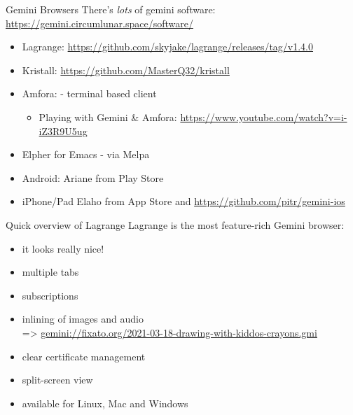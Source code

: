 \documentclass[presentation, 11pt,  aspectratio=169]{beamer}
\begin{document}
\begin{frame}[label={sec:orgd544e78}]{Gemini Browsers}
There's \emph{lots} of gemini software: \url{https://gemini.circumlunar.space/software/}\\

\begin{itemize}
\item \alert{Lagrange:} \url{https://github.com/skyjake/lagrange/releases/tag/v1.4.0}\\
\item \alert{Kristall:} \url{https://github.com/MasterQ32/kristall}\\
\item \alert{Amfora:} - terminal based client\\
\begin{itemize}
\item Playing with Gemini \& Amfora: \url{https://www.youtube.com/watch?v=i-iZ3R9U5ug}\\
\end{itemize}
\item \alert{Elpher} for Emacs - via Melpa\\
\item \alert{Android:} Ariane from Play Store\\
\item \alert{iPhone/Pad} Elaho from App Store and \url{https://github.com/pitr/gemini-ios}\\
\end{itemize}
\end{frame}

\begin{frame}[label={sec:org2448b1b}]{Quick overview of Lagrange}
Lagrange is the most feature-rich Gemini browser:\\
\begin{itemize}
\item it looks really nice!\\
\item multiple tabs\\
\item subscriptions\\
\item inlining of images and audio\\
=> \href{gemini://fixato.org/2021-03-18-drawing-with-kiddos-crayons.gmi}{gemini://fixato.org/2021-03-18-drawing-with-kiddos-crayons.gmi}\\
\item clear certificate management\\
\item split-screen view\\
\item available for Linux, Mac and Windows\\
\end{itemize}
\end{frame}
\end{document}
